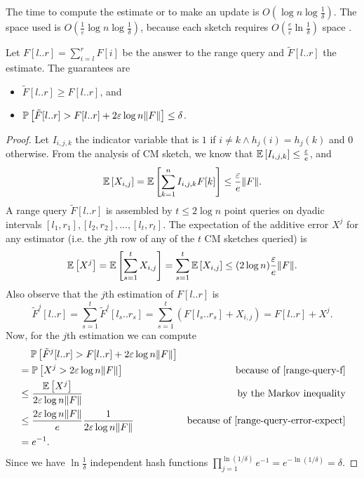 The time to compute the estimate or to make an update is $O(\log n\log\frac{1}{\delta})$. The space used is $O(\frac{1}{\varepsilon}\log n\log\frac{1}{\delta})$, because each sketch requires $O(\frac{e}{\varepsilon}\ln\frac{1}{\delta})$ space \cite{Cormode05}.

Let $F[l..r]=\sum_{i=l}^rF[i]$ be the answer to the range query and $\tilde{F}[l..r]$ the estimate. The guarantees are
\begin{itemize}
  \item $\tilde{F}[l..r] \geq F[l..r]$, and
  \item $\operatorname*{\mathbb{P}}\left[{\tilde{F}[l..r] > F[l..r]+2\varepsilon\log n\lVert F\rVert}\right] \leq \delta$.
\end{itemize}

\begin{proof}
  Let $I_{i,j,k}$ the indicator variable that is $1$ if $i \ne k \wedge h_j(i)=h_j(k)$ and $0$ otherwise. From the analysis of CM sketch, we know that
  $\mathbb{E}\left[{I_{i,j,k}}\right] \leq \frac{\varepsilon}{e}$,
  and
  $$\mathbb{E}\left[{X_{i,j}}\right] = \mathbb{E}\left[{\sum_{k=1}^n I_{i,j,k}F[k]}\right] \leq \frac{\varepsilon}{e}\lVert F\rVert.$$
  A range query $\tilde{F}[l..r]$ is assembled by  $t \leq 2\log n$ point queries on dyadic intervals $[l_1,r_1], [l_2,r_2], \dots, [l_t,r_t]$. 
  The expectation of the additive error $X^j$ for any estimator (i.e. the $j$th row of any of the $t$ CM sketches queried) is
  \begin{equation}
    \mathbb{E}\left[{X^j}\right] = \mathbb{E}\left[{\sum_{s=1}^tX_{i,j}}\right]=\sum_{s=1}^t\mathbb{E}\left[{X_{i,j}}\right] \leq (2\log n) \frac{\varepsilon}{e}\lVert F\rVert.
    \label{range-query-error-expect}
  \end{equation}
  Also observe that the $j$th estimation of $F[l..r]$ is
  \begin{equation}
    \tilde{F}^j[l..r]= \sum_{s=1}^t \tilde{F}^j[l_s..r_s] = \sum_{s=1}^t (F[l_s..r_s] + X_{i,j}) = F[l..r]+X^j.
    \label{range-query-f}
  \end{equation}
  Now, for the $j$th estimation we can compute
  \begin{align*}
    &\phantom{={}} \prob{\tilde{F}^j[l..r] > F[l..r]+2\varepsilon\log n\norm{F}} & \\
    &= \prob{X^j > 2\varepsilon\log n\norm{F}} & \text{because of \eqref{range-query-f}} \\
    &\leq \frac{\E{X^j}}{2\varepsilon\log n\norm{F}} & \text{by the Markov inequality} \\
    &\leq  \frac{2\varepsilon\log n\norm{F}}{e} \frac{1}{2\varepsilon\log n\norm{F}} & \text{because of \eqref{range-query-error-expect}} \\
    &= e^{-1}. &
  \end{align*}
  Since we have $\ln\frac{1}{\delta}$ independent hash functions $\prod_{j=1}^{\ln(1/\delta)}e^{-1}=e^{-\ln(1/\delta)}=\delta$.
\end{proof}

